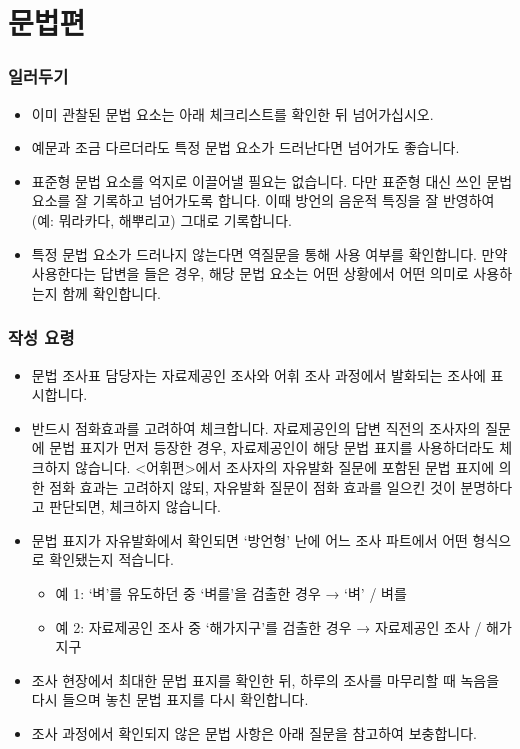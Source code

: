 \chapter{문법편}

\subsection{일러두기}
\begin{itemize}[noitemsep]
  \item 이미 관찰된 문법 요소는 아래 체크리스트를 확인한 뒤 넘어가십시오.
  \item 예문과 조금 다르더라도 특정 문법 요소가 드러난다면 넘어가도 좋습니다.
  \item 표준형 문법 요소를 억지로 이끌어낼 필요는 없습니다. 다만 표준형 대신 쓰인 문법 요소를 잘 기록하고 넘어가도록 합니다. 이때 방언의 음운적 특징을 잘 반영하여(예: 뭐라카다, 해뿌리고) 그대로 기록합니다.
  \item 특정 문법 요소가 드러나지 않는다면 역질문을 통해 사용 여부를 확인합니다. 만약 사용한다는 답변을 들은 경우, 해당 문법 요소는 어떤 상황에서 어떤 의미로 사용하는지 함께 확인합니다.
\end{itemize}

\subsection{작성 요령}
\begin{itemize}[noitemsep]
  \item 문법 조사표 담당자는 자료제공인 조사와 어휘 조사 과정에서 발화되는 조사에 표시합니다.
  \item 반드시 점화효과를 고려하여 체크합니다. 자료제공인의 답변 직전의 조사자의 질문에 문법 표지가 먼저 등장한 경우, 자료제공인이 해당 문법 표지를 사용하더라도 체크하지 않습니다. <어휘편>에서 조사자의 자유발화 질문에 포함된 문법 표지에 의한 점화 효과는 고려하지 않되, 자유발화 질문이 점화 효과를 일으킨 것이 분명하다고 판단되면, 체크하지 않습니다. 
  \item 문법 표지가 자유발화에서 확인되면 `방언형' 난에 어느 조사 파트에서 어떤 형식으로 확인됐는지 적습니다.
    \begin{itemize}[noitemsep]
      \item 예 1: `벼'를 유도하던 중 `벼를'을 검출한 경우 → `벼' / 벼를
      \item 예 2: 자료제공인 조사 중 `해가지구'를 검출한 경우 → 자료제공인 조사 / 해가지구
    \end{itemize}
  \item 조사 현장에서 최대한 문법 표지를 확인한 뒤, 하루의 조사를 마무리할 때 녹음을 다시 들으며 놓친 문법 표지를 다시 확인합니다.
  \item 조사 과정에서 확인되지 않은 문법 사항은 아래 질문을 참고하여 보충합니다.
\end{itemize}

